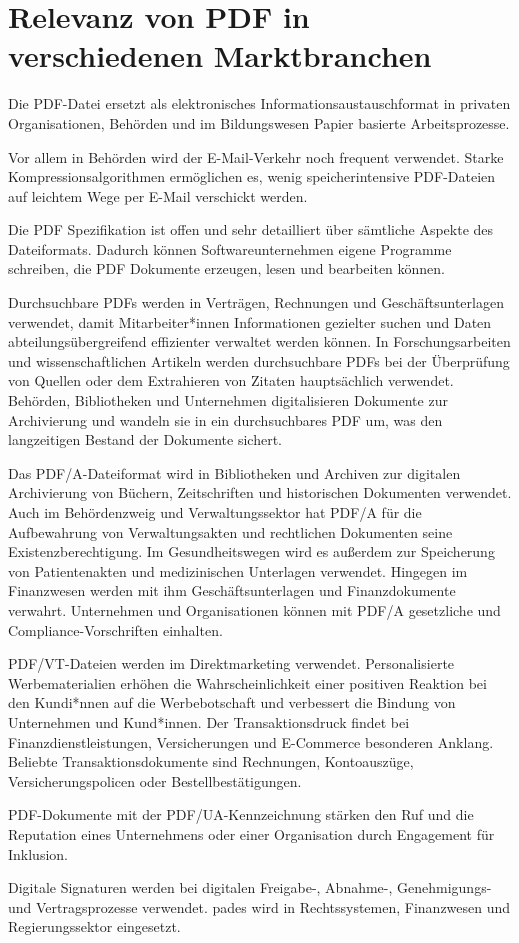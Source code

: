 \section{Relevanz von PDF in verschiedenen Marktbranchen}
Die PDF-Datei ersetzt als elektronisches Informationsaustauschformat in privaten Organisationen, Behörden und im Bildungswesen  Papier basierte Arbeitsprozesse.

Vor allem in Behörden wird der E-Mail-Verkehr noch frequent verwendet. Starke Kompressionsalgorithmen ermöglichen es, wenig speicherintensive PDF-Dateien auf leichtem Wege per E-Mail verschickt werden.

Die PDF Spezifikation ist offen und sehr detailliert über sämtliche Aspekte des Dateiformats. Dadurch können Softwareunternehmen eigene Programme schreiben, die PDF Dokumente erzeugen, lesen und bearbeiten können.

Durchsuchbare PDFs werden in Verträgen, Rechnungen und Geschäftsunterlagen verwendet, damit Mitarbeiter*innen Informationen gezielter suchen und Daten abteilungsübergreifend effizienter verwaltet werden können. In Forschungsarbeiten und wissenschaftlichen Artikeln werden durchsuchbare PDFs bei der Überprüfung von Quellen oder dem Extrahieren von Zitaten hauptsächlich verwendet. Behörden, Bibliotheken und Unternehmen digitalisieren Dokumente zur Archivierung und wandeln sie in ein durchsuchbares PDF um, was den langzeitigen Bestand der Dokumente sichert. \cite{adobe-search}

Das PDF/A-Dateiformat wird in Bibliotheken und Archiven zur digitalen Archivierung von Büchern, Zeitschriften und historischen Dokumenten verwendet. Auch im Behördenzweig und Verwaltungssektor hat PDF/A für die Aufbewahrung von Verwaltungsakten und rechtlichen Dokumenten seine Existenzberechtigung. Im Gesundheitswegen wird es außerdem zur Speicherung von Patientenakten und medizinischen Unterlagen verwendet. Hingegen im Finanzwesen werden mit ihm Geschäftsunterlagen und Finanzdokumente verwahrt. Unternehmen und Organisationen können mit PDF/A gesetzliche und Compliance-Vorschriften einhalten. \cite{adobe-pdf-a}

PDF/VT-Dateien werden im Direktmarketing verwendet. Personalisierte Werbematerialien erhöhen die Wahrscheinlichkeit einer positiven Reaktion bei den Kundi*nnen auf die Werbebotschaft und verbessert die Bindung von Unternehmen und Kund*innen. Der Transaktionsdruck findet bei Finanzdienstleistungen, Versicherungen und E-Commerce besonderen Anklang. Beliebte Transaktionsdokumente sind Rechnungen, Kontoauszüge, Versicherungspolicen oder Bestellbestätigungen. \cite{adobe-pdf-vt}

PDF-Dokumente mit der PDF/UA-Kennzeichnung stärken den Ruf und die Reputation eines Unternehmens oder einer Organisation durch Engagement für Inklusion. \cite{adobe-pdf-ua}

Digitale Signaturen werden bei digitalen Freigabe-, Abnahme-, Genehmigungs- und Vertragsprozesse verwendet. \gls{pades} wird in Rechtssystemen, Finanzwesen und Regierungssektor eingesetzt. \cite{adobe-pdf-pades} 